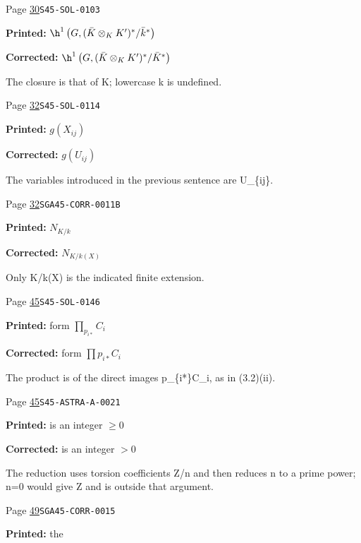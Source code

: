 \begin{description}
\smallskip
\item[\hypertarget{apparatus:EN-0011}{11}] Page \hyperlink{printpage:en:30}{30}\quad\texttt{S45-SOL-0103}
\par\noindent\textbf{Printed:} \(\h^1\left(G,(\bar K\otimes_K K')^*/\bar k^*\right)\)
\par\noindent\textbf{Corrected:} \(\h^1\left(G,(\bar K\otimes_K K')^*/\bar K^*\right)\)
\par\noindent The closure is that of K; lowercase k is undefined.
\smallskip
\item[\hypertarget{apparatus:EN-0012}{12}] Page \hyperlink{printpage:en:32}{32}\quad\texttt{S45-SOL-0114}
\par\noindent\textbf{Printed:} \(g(X_{ij})\)
\par\noindent\textbf{Corrected:} \(g(U_{ij})\)
\par\noindent The variables introduced in the previous sentence are U\_\{ij\}.
\smallskip
\item[\hypertarget{apparatus:EN-0013}{13}] Page \hyperlink{printpage:en:32}{32}\quad\texttt{SGA45-CORR-0011B}
\par\noindent\textbf{Printed:} \(N_{K/k}\)
\par\noindent\textbf{Corrected:} \(N_{K/k(X)}\)
\par\noindent Only K/k(X) is the indicated finite extension.
\smallskip
\item[\hypertarget{apparatus:EN-0014}{14}] Page \hyperlink{printpage:en:45}{45}\quad\texttt{S45-SOL-0146}
\par\noindent\textbf{Printed:} form $\prod_{p_{i*}}C_i$
\par\noindent\textbf{Corrected:} form $\prod p_{i*}C_i$
\par\noindent The product is of the direct images p\_\{i*\}C\_i, as in (3.2)(ii).
\smallskip
\item[\hypertarget{apparatus:EN-0015}{15}] Page \hyperlink{printpage:en:45}{45}\quad\texttt{S45-ASTRA-A-0021}
\par\noindent\textbf{Printed:} is an integer $\geqslant0$
\par\noindent\textbf{Corrected:} is an integer $>0$
\par\noindent The reduction uses torsion coefficients Z/n and then reduces n to a prime power; n=0 would give Z and is outside that argument.
\smallskip
\item[\hypertarget{apparatus:EN-0016}{16}] Page \hyperlink{printpage:en:49}{49}\quad\texttt{SGA45-CORR-0015}
\par\noindent\textbf{Printed:} the 

\end{description}
